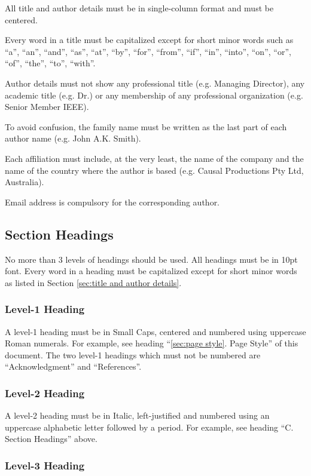 \documentclass[10pt,conference,a4paper]{IEEEtran}
\begin{document}
All title and author details must be in single-column format and
must be centered.

Every word in a title must be capitalized except for short minor
words such as ``a'', ``an'', ``and'', ``as'', ``at'', ``by'', ``for'', ``from'',
``if'', ``in'', ``into'', ``on'', ``or'', ``of'', ``the'', ``to'', ``with''.

Author details must not show any professional title (e.g.
Managing Director), any academic title (e.g. Dr.) or any
membership of any professional organization (e.g. Senior
Member IEEE).

To avoid confusion, the family name must be written as the
last part of each author name (e.g. John A.K. Smith).

Each affiliation must include, at the very least, the name of
the company and the name of the country where the author is
based (e.g. Causal Productions Pty Ltd, Australia).

Email address is compulsory for the corresponding author.


\subsection{Section Headings}

No more than 3 levels of headings should be used.  All headings must
be in 10pt font.  Every word in a heading must be capitalized except
for short minor words as listed in Section \ref{sec:title and author
details}.

\subsubsection{Level-1 Heading}

A level-1 heading must be in Small Caps, centered and numbered using
uppercase Roman numerals.  For example, see heading ``\ref{sec:page
style}. Page Style'' of this document.  The two level-1 headings which
must not be numbered are ``Acknowledgment'' and ``References''.

\subsubsection{Level-2 Heading}

A level-2 heading must be in Italic, left-justified and numbered using
an uppercase alphabetic letter followed by a period.  For example, see
heading ``C. Section Headings'' above.

\subsubsection{Level-3 Heading}
\end{document}

